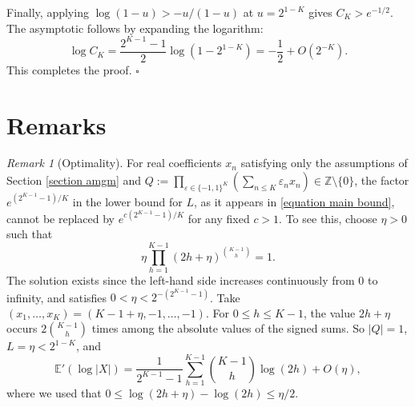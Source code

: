 \documentclass[reqno,12pt]{amsart}
\theoremstyle{remark}
\newtheorem{remark}[theorem]{Remark}
\newcommand{\EE}{\mathbb{E}}
\begin{document}
Finally, applying $\log(1-u)>-u/(1-u)$ at $u=2^{1-K}$ gives $C_K>e^{-1/2}$. The asymptotic follows by expanding the logarithm:
\[ \log C_K=\frac{2^{K-1}-1}{2}\log(1-2^{1-K}) = -\frac{1}{2} + O(2^{-K}). \]
This completes the proof. \hfill$\square$

\section{Remarks}\label{section remarks}

\begin{remark}[Optimality]\label{remark sharpness}
For real coefficients $x_n$ satisfying only the assumptions of Section \ref{section amgm} and $Q := \prod_{\varepsilon\in\{-1,1\}^K}(\sum_{n\leq K}\varepsilon_n x_n)\in\mathbb{Z}\setminus\{0\}$, the factor $e^{(2^{K-1}-1)/K}$ in the lower bound for $L$, as it appears in \eqref{equation main bound}, cannot be replaced by $e^{c(2^{K-1}-1)/K}$ for any fixed $c>1$. To see this, choose $\eta>0$ such that
$$ \eta\prod_{h=1}^{K-1}(2h+\eta)^{\binom{K-1}{h}}=1. $$
The solution exists since the left-hand side increases continuously from $0$ to infinity, and satisfies $0<\eta<2^{-(2^{K-1}-1)}$. Take $(x_1,\ldots,x_K)=(K-1+\eta,-1,\ldots,-1)$. For $0\leq h\leq K-1$, the value $2h+\eta$ occurs $2\binom{K-1}{h}$ times among the absolute values of the signed sums. So $|Q|=1$, $L=\eta<2^{1-K}$, and
\begin{equation}
 \EE'(\log|X|) = \frac{1}{2^{K-1}-1}\sum_{h=1}^{K-1}\binom{K-1}{h}\log(2h) + O(\eta), \label{eq logX}
\end{equation}
where we used that $0\leq\log(2h+\eta)-\log(2h)\leq\eta/2$.


\end{remark}
\end{document}
